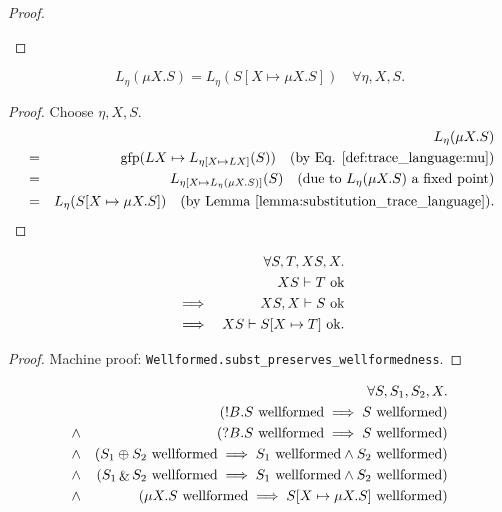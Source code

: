 \documentclass{llncs}
\newcommand*{\gfp}{\mathrm{gfp}}
\newcommand*{\send}{\mathord{!}}
\newcommand*{\recv}{\mathord{?}}
\newcommand*{\echoice}{\oplus}
\newcommand*{\ichoice}{\mathop{\&}}
\newcommand*{\ok}[1]{\text{$#1$ {\normalfont \rmfamily ok}}}
\newcommand*{\wf}[1]{\text{$#1$ {\normalfont \rmfamily wellformed}}}
\newcommand*{\envimpl}       [2]{#1 \vdash #2}
\newcommand*{\envimplok}     [2]{\envimpl{#1}{\ok{#2}}}
\renewcommand*{\|}{\;|\;}
\newcommand*{\machproofc}[1]{Machine proof: \code{#1}.}
\newcommand*{\code}[1]{\texttt{#1}}
\begin{document}
\begin{proof}
\begin{enumerate}
  \end{enumerate}
\end{proof}


\begin{lemma}
  \label{lemma:mu_expansion_trace_language}
  \begin{equation*}
    L_\eta(\mu X.S) = L_\eta(S[X \mapsto \mu X.S]) \quad \forall \eta, X, S.
  \end{equation*}
\end{lemma}

\begin{proof}
  Choose $\eta, X, S$.
  \begin{eqnarray*}
    &&  L_\eta(\mu X.S) \\
    &=& \gfp(LX \mapsto L_{\eta[X \mapsto LX]}(S))
        \quad \text{(by Eq. \ref{def:trace_language:mu})} \\
    &=& L_{\eta[X \mapsto L_\eta(\mu X.S)]}(S)
        \quad \text{(due to $L_\eta(\mu X.S)$ a fixed point)} \\
    &=& L_\eta(S[X \mapsto \mu X.S])
        \quad \text{(by Lemma \ref{lemma:substitution_trace_language})}.
  \end{eqnarray*}
\end{proof}


\begin{lemma}
  \label{lemma:substitution_wellformedness}
  \begin{eqnarray*}
    &&         \forall S, T, XS, X. \\
    &&         \envimplok{XS}{T} \\
    &\implies& \envimplok{XS, X}{S} \\
    &\implies& \envimplok{XS}{S[X \mapsto T]}.
  \end{eqnarray*}
\end{lemma}

\begin{proof}
  \machproofc{Wellformed.subst\_preserves\_wellformedness}
\end{proof}


\begin{lemma}
  \label{lemma:inversion_wellformedness}
  \begin{eqnarray*}
    &&      \forall S, S_1, S_2, X. \\
    &&      (\wf{\send B.S} \implies \wf{S}) \\
    &\land& (\wf{\recv B.S} \implies \wf{S}) \\
    &\land& (\wf{S_1 \echoice S_2} \implies \wf{S_1} \land \wf{S_2}) \\
    &\land& (\wf{S_1 \ichoice S_2} \implies \wf{S_1} \land \wf{S_2}) \\
    &\land& (\wf{\mu X.S} \implies \wf{S[X \mapsto \mu X.S]})
  \end{eqnarray*}
\end{lemma}
\end{document}
